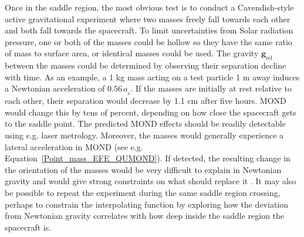 \documentclass[fleqn,usenatbib,useAMS]{mnras} %
\begin{document}
Once in the saddle region, the most obvious test is to conduct a Cavendish-style active gravitational experiment where two masses freely fall towards each other and both fall towards the spacecraft. To limit uncertainties from Solar radiation pressure, one or both of the masses could be hollow so they have the same ratio of mass to surface area, or identical masses could be used. The gravity $\bm{g}_\text{rel}$ between the masses could be determined by observing their separation decline with time. As an example, a 1 kg mass acting on a test particle 1 m away induces a Newtonian acceleration of $0.56 \, a_{_0}$. If the masses are initially at rest relative to each other, their separation would decrease by 1.1 cm after five hours. MOND would change this by tens of percent, depending on how close the spacecraft gets to the saddle point. The predicted MOND effects should be readily detectable using e.g. laser metrology. Moreover, the masses would generally experience a lateral acceleration in MOND (see e.g. Equation~\ref{Point_mass_EFE_QUMOND}). If detected, the resulting change in the orientation of the masses would be very difficult to explain in Newtonian gravity and would give strong constraints on what should replace it \citep{Banik_2018_EFE}. It may also be possible to repeat the experiment during the same saddle region crossing, perhaps to constrain the interpolating function by exploring how the deviation from Newtonian gravity correlates with how deep inside the saddle region the spacecraft is.
\end{document}
